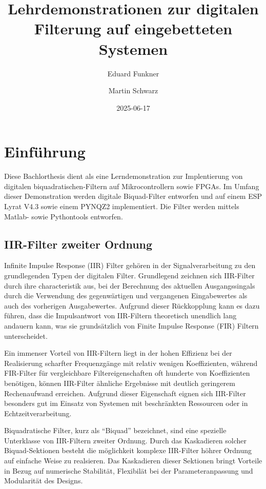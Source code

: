 \documentclass[
  ngerman,
  letterpaper,
  DIV=11]{scrreprt}
\title{Lehrdemonstrationen zur digitalen Filterung auf eingebetteten
Systemen}
\author{Eduard Funkner \and Martin Schwarz}
\date{2025-06-17}
\renewcommand*\contentsname{Inhaltsverzeichnis}
\newcommand\contentsname{Inhaltsverzeichnis}
\begin{document}
\maketitle

\renewcommand*\contentsname{Inhaltsverzeichnis}
{
\hypersetup{linkcolor=}
\setcounter{tocdepth}{2}
\tableofcontents
}

\chapter{Einführung}\label{einfuxfchrung}

Diese Bachlorthesis dient als eine Lerndemonstration zur Implentierung
von digitalen biquadratischen-Filtern auf Mikrocontrollern sowie FPGAs.
Im Umfang dieser Demonstration werden digitale Biquad-Filter entworfen
und auf einem ESP Lyrat V4.3 sowie einem PYNQZ2 implementiert. Die
Filter werden mittels Matlab- sowie Pythontools entworfen.

\section{IIR-Filter zweiter Ordnung}\label{iir-filter-zweiter-ordnung}

Infinite Impulse Response (IIR) Filter gehören in der Signalverarbeitung
zu den grundlegenden Typen der digitalen Filter. Grundlegend zeichnen
sich IIR-Filter durch ihre characteristik aus, bei der Berechnung des
aktuellen Ausgangssingals durch die Verwendung des gegenwärtigen und
vergangenen Eingabewertes als auch des vorherigen Ausgabewertes.
Aufgrund dieser Rückkopplung kann es dazu führen, dass die Impulsantwort
von IIR-Filtern theoretisch unendlich lang andauern kann, was sie
grundsätzlich von Finite Impulse Response (FIR) Filtern unterscheidet.

Ein immenser Vorteil von IIR-Filtern liegt in der hohen Effizienz bei
der Realisierung scharfter Frequenzgänge mit relativ wenigen
Koeffizienten, während FIR-Filter für vergleichbare Filtereigenschaften
oft hunderte von Koeffizienten benötigen, können IIR-Filter ähnliche
Ergebnisse mit deutlich geringerem Rechenaufwand erreichen. Aufgrund
dieser Eigenschaft eignen sich IIR-Filter besonders gut im Einsatz von
Systemen mit beschränkten Ressourcen oder in Echtzeitverarbeitung.

Biquadratische Filter, kurz als ``Biquad'' bezeichnet, sind eine
spezielle Unterklasse von IIR-Filtern zweiter Ordnung. Durch das
Kaskadieren solcher Biquad-Sektionen besteht die möglichkeit komplexe
IIR-Filter höhrer Ordnung auf einfache Weise zu realsieren. Das
Kaskadieren dieser Sektionen bringt Vorteile in Bezug auf numerische
Stabilität, Flexibilät bei der Parameteranpassung und Modularität des
Designs.
\end{document}
